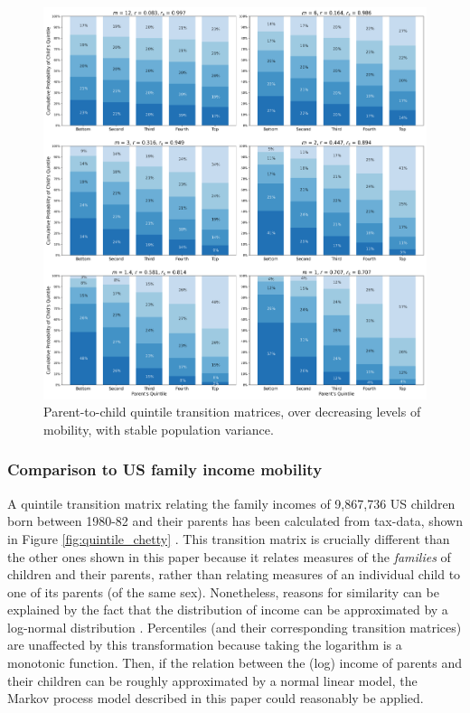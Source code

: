 \documentclass[a4paper,11pt]{article} %
\begin{document}
\begin{figure}[H]
\centering
\advance\leftskip-0.6in
\includegraphics[width=6.5in]{figures/quintile-mobility.png} 
\caption{Parent-to-child quintile transition matrices, over decreasing levels of mobility, with stable population variance.}
\label{fig:quintile_mobility}
\end{figure}


\subsubsection*{Comparison to US family income mobility}

A quintile transition matrix relating the family incomes of 9,867,736 US children born between 1980-82 and their parents has been calculated from tax-data, shown in Figure \ref{fig:quintile_chetty} \cite{chetty}. This transition matrix is crucially different than the other ones shown in this paper because it relates measures of the \emph{families} of children and their parents, rather than relating measures of an individual child to one of its parents (of the same sex). Nonetheless, reasons for similarity can be explained by the fact that the distribution of income can be approximated by a log-normal distribution \cite{battistin, neal}. Percentiles (and their corresponding transition matrices) are unaffected by this transformation because taking the logarithm is a monotonic function. Then, if the relation between the (log) income of parents and their children can be roughly approximated by a normal linear model, the Markov process model described in this paper could reasonably be applied.
\end{document}
